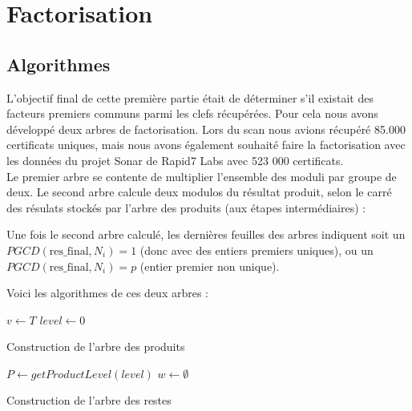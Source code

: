 \section{Factorisation}

\subsection{Algorithmes}

L'objectif final de cette première partie était de déterminer s'il existait des facteurs premiers communs
parmi les clefs récupérées. Pour cela nous avons développé deux arbres de factorisation.
Lors du scan nous avions récupéré 85.000 certificats uniques, mais nous avons également souhaité faire la factorisation avec les données du projet Sonar de Rapid7 Labs avec 523 000 certificats.\\


Le premier arbre se contente de multiplier l'ensemble des moduli par groupe de deux.
Le second arbre calcule deux modulos du résultat produit, selon le carré des résulats stockés par l'arbre des produits (aux étapes intermédiaires) :

Une fois le second arbre calculé, les dernières feuilles des arbres indiquent soit un $PGCD(\text{res\_final}, N_i ) = 1$ (donc avec des entiers premiers uniques), ou un $PGCD(\text{res\_final}, N_i ) = p$ (entier premier non unique).

Voici les algorithmes de ces deux arbres :

\begin{algorithm}[H]
\label{alg:productTree}
 $v \leftarrow T$\;
 $level \leftarrow 0$\;
 \caption{Construction de l'arbre des produits} 
\end{algorithm}
\vspace{0.7cm}



\begin{algorithm}[H]
 \label{alg:remainderTree}
 $P \leftarrow getProductLevel(level)$\;
 $w \leftarrow \emptyset$\;
 \caption{Construction de l'arbre des restes}
\end{algorithm}
\vspace{0.7cm}


